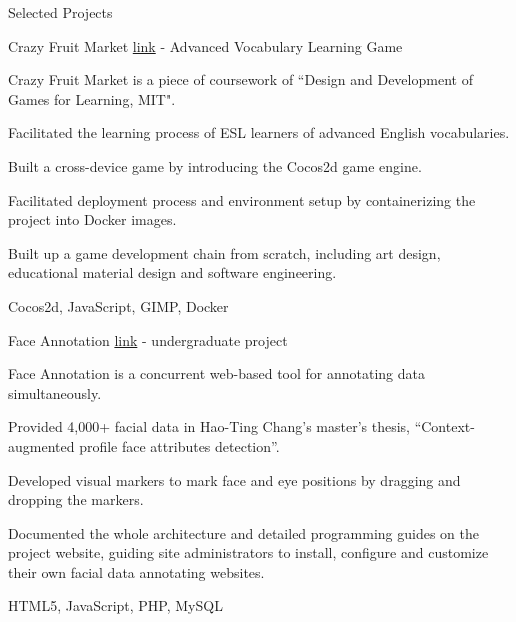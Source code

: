 \documentclass{cv}
\begin{document}
\pagebreak


\begin{cvSection}{Selected Projects}

\begin{projectSubsection}{Crazy Fruit Market  \href{http://jasson15.github.io/crazy-fruit-market}{link}}{ - }{Advanced Vocabulary Learning Game}

\item Crazy Fruit Market is a piece of coursework of ``Design and Development of Games for Learning, MIT".
\item Facilitated the learning process of ESL learners of advanced English vocabularies.
\item Built a cross-device game by introducing the Cocos2d game engine.
\item Facilitated deployment process and environment setup by containerizing the project into Docker images.
\item Built up a game development chain from scratch, including art design, educational material design and software engineering.
\item Cocos2d, JavaScript, GIMP, Docker

\end{projectSubsection}

\begin{projectSubsection}{Face Annotation \href{http://cmlab.csie.ntu.edu.tw/~pi/face_annotation}{link}}{ - }{undergraduate project}

\item Face Annotation is a concurrent web-based tool for annotating data simultaneously.
\item Provided 4,000+ facial data in Hao-Ting Chang's master's thesis, ``Context-augmented profile face attributes detection''.
\item Developed visual markers to mark face and eye positions by dragging and dropping the markers. 
\item Documented the whole architecture and detailed programming guides on the project website, guiding site administrators to install, configure and customize their own facial data annotating websites. 
\item HTML5, JavaScript, PHP, MySQL


\end{projectSubsection}
\end{cvSection}
\end{document}
